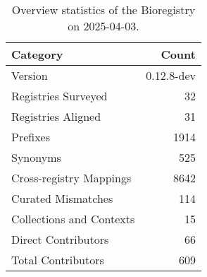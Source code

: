 \begin{table}
\caption{Overview statistics of the Bioregistry on 2025-04-03.}
\label{tab:bioregistry-summary}
\begin{tabular}{lr}
\toprule
Category & Count \\
\midrule
Version & 0.12.8-dev \\
Registries Surveyed & 32 \\
Registries Aligned & 31 \\
Prefixes & 1914 \\
Synonyms & 525 \\
Cross-registry Mappings & 8642 \\
Curated Mismatches & 114 \\
Collections and Contexts & 15 \\
Direct Contributors & 66 \\
Total Contributors & 609 \\
\bottomrule
\end{tabular}
\end{table}
